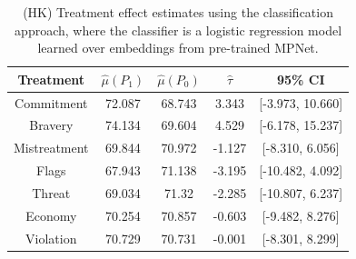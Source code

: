 \documentclass{article}
\begin{document}
\begin{table}[!ht]
    \centering
    \begin{tabular}{c|cccc}
        \toprule
        Treatment & $\hat{\mu}(P_1)$ & $\hat{\mu}(P_0)$ & $\hat{\tau}$ & 95\% CI \\
        \midrule
        Commitment & 72.087 & 68.743 & \textcolor{green!50!black}{3.343} & [-3.973, 10.660] \\
        Bravery & 74.134 & 69.604 & \textcolor{green!50!black}{4.529} & [-6.178, 15.237] \\
        Mistreatment & 69.844 & 70.972 & \textcolor{red!80!black}{-1.127} & [-8.310, 6.056] \\
        Flags & 67.943 & 71.138 & \textcolor{red!80!black}{-3.195} & [-10.482, 4.092] \\
        Threat & 69.034 & 71.32 & \textcolor{red!80!black}{-2.285} & [-10.807, 6.237]  \\
        Economy & 70.254 & 70.857 & \textcolor{red!80!black}{-0.603} & [-9.482, 8.276] \\
        Violation & 70.729 & 70.731 & \textcolor{red!80!black}{-0.001} & [-8.301, 8.299] \\
        \bottomrule
    \end{tabular}
    \caption{(HK) Treatment effect estimates using the classification approach, where the classifier is a logistic regression model learned over embeddings from pre-trained MPNet.}
    \label{tab:results_clf_mpnet}
\end{table}

\end{document}
